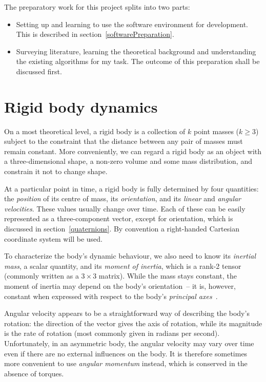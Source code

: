 The preparatory work for this project splits into two parts:
\begin{itemize}
\item Setting up and learning to use the software environment for development. This is described
    in section~\ref{softwarePreparation}.
\item Surveying literature, learning the theoretical background and understanding the existing
    algorithms for my task. The outcome of this preparation shall be discussed first.
\end{itemize}

\section{Rigid body dynamics}
On a most theoretical level, a rigid body is a collection of $k$ point masses ($k \ge 3$) subject
to the constraint that the distance between any pair of masses must remain constant. More
conveniently, we can regard a rigid body as an object with a three-dimensional shape, a non-zero
volume and some mass distribution, and constrain it not to change shape.

At a particular point in time, a rigid body is fully determined by four quantities: the
\emph{position} of its centre of mass, its \emph{orientation}, and its \emph{linear} and
\emph{angular velocities}. These values usually change over time. Each of these can be easily
represented as a three-component vector, except for orientation, which is discussed in
section~\ref{quaternions}. By convention a right-handed Cartesian coordinate system will be used.

To characterize the body's dynamic behaviour, we also need to know its \emph{inertial mass},
a scalar quantity, and its \emph{moment of inertia}, which is a rank-2 tensor (commonly written
as a $3\times3$ matrix). While the mass stays constant, the moment of inertia may
depend on the body's orientation~-- it is, however, constant when expressed with respect to the
body's \emph{principal axes}~\cite{Feynman:63,Goldstein:80}.

Angular velocity appears to be a straightforward way of describing the body's rotation: the
direction of the vector gives the axis of rotation, while its magnitude is the rate of rotation
(most commonly given in radians per second). Unfortunately, in an asymmetric body, the angular
velocity may vary over time even if there are no external influences on the body. It is therefore
sometimes more convenient to use \emph{angular momentum} instead, which is conserved in the
absence of torques.

